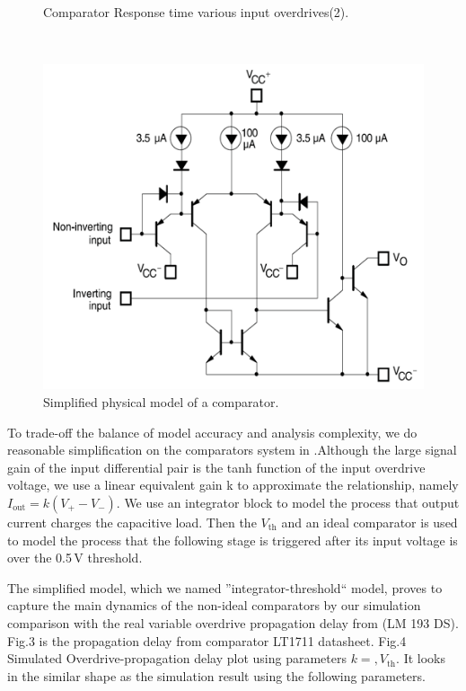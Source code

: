 \begin{figure}
\begin{minipage}{0.32\textwidth}
  \caption{  \label{fig:copd2} Comparator Response time various input overdrives(2).}
\end{minipage}
~
\begin{minipage}{0.32\textwidth}
    \centering
    \includegraphics[width=\textwidth]{Figure/section3/copd/physicalmodelcomp.PNG}
    \caption{\label{fig:physicalmodel} Simplified physical model of a comparator.}
\end{minipage}
\end{figure}
To trade-off the balance of model accuracy and analysis complexity, we do reasonable simplification on the comparators system in .Although the large signal gain of the input differential pair is the tanh function of the input overdrive voltage, we use a linear equivalent gain k to approximate the relationship, namely $I_{\text{out}} = k(V_{+} - V_{-})$. We use an integrator block to model the process that output current charges the capacitive load. Then the $V_{\text{th}}$ and an ideal comparator is used to model the process that the following stage is triggered after its input voltage is over the 0.5\,V threshold. 

The simplified model, which we named ''integrator-threshold`` model, proves to capture the main dynamics of the non-ideal comparators by our simulation comparison with the real variable overdrive propagation delay from (LM 193 DS). Fig.3 is the propagation delay from comparator LT1711 datasheet. 
Fig.4 Simulated Overdrive-propagation delay plot using parameters $k = , V_{\text{th}}$. It looks in the similar shape as the simulation result using the following parameters.


